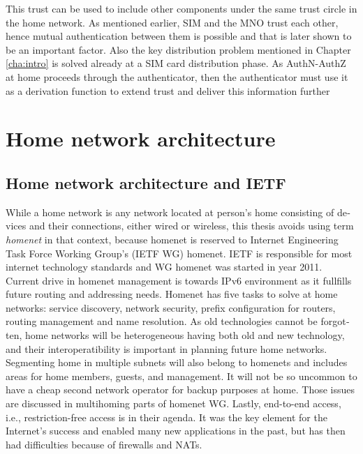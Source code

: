\documentclass[12pt,a4paper,english]{tutthesis}
\begin{document}
\begin{otherlanguage}{english}
This trust can be used to include other components under the
same trust circle in the home network. As mentioned earlier,  SIM
and the MNO trust each other, hence mutual authentication between them is
possible and that is later shown to be an important factor.  Also the
key distribution problem mentioned in Chapter \ref{cha:intro} is solved
already at a SIM card distribution phase.  As AuthN-AuthZ at home
proceeds through the authenticator, then the authenticator must
use it as a derivation function
to extend trust 
 and
deliver this information further




\chapter{Home network architecture}
\label{sec-3}

\section{Home network architecture and IETF}
\label{sec-3-1}


While a home network is any network located at person's home consisting
of devices and their connections, either wired or wireless,
this thesis avoids using term \emph{homenet} in that context,
because  homenet  is  reserved to 
Internet Engineering Task Force Working Group's (IETF
WG) homenet. IETF is responsible for  most internet technology standards and 
WG homenet was started in year 2011.
Current drive in homenet management is towards IPv6 environment
 as it fullfills future routing and addressing needs. 
Homenet has five tasks to solve at home networks: service discovery, network security, 
prefix configuration for routers, routing management and name
resolution\cite{homenet-charter}.
As old technologies cannot be forgotten, home networks will be heterogeneous having both
old and new technology, and their interoperatibility is important in
planning future home networks. 
Segmenting home in multiple subnets will also belong
to homenets and includes areas for home members, guests,
and management. It will not be so uncommon to have a cheap second
network operator for backup purposes at home. Those issues are
discussed in multihoming parts of homenet WG.
Lastly, end-to-end access, i.e., restriction-free access is in their agenda. 
It was the key element for the Internet's success and enabled many new
applications in the past, but has then had difficulties because of
firewalls and NATs.




\end{otherlanguage}
\end{document}
